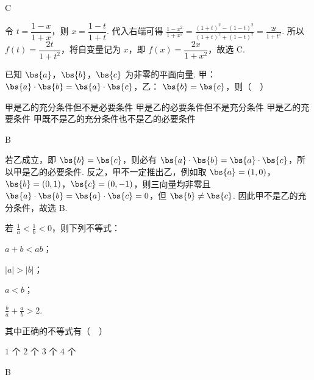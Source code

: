 \begin{answer}
C
\end{answer}

\begin{solution}
令 \(t=\dfrac{1-x}{1+x}\)，则 \(x=\dfrac{1-t}{1+t}\). 代入右端可得
\(\displaystyle\frac{1-x^2}{1+x^2}=\frac{(1+t)^2-(1-t)^2}{(1+t)^2+(1-t)^2}=\frac{2t}{1+t^2}\). 所以 \(f(t)=\dfrac{2t}{1+t^2}\)，将自变量记为 \(x\)，即 \(f(x)=\dfrac{2x}{1+x^2}\)，故选 C.
\end{solution}

\begin{problem}
已知 \(\bs{a}\)，\(\bs{b}\)，\(\bs{c}\) 为非零的平面向量. 甲： \(\bs{a} \cdot \bs{b} = \bs{a} \cdot \bs{c}\)，乙： \(\bs{b} = \bs{c}\)，则（\(\quad\)）

\choices
    {甲是乙的充分条件但不是必要条件}
    {甲是乙的必要条件但不是充分条件}
    {甲是乙的充要条件}
    {甲既不是乙的充分条件也不是乙的必要条件}
\end{problem}

\begin{answer}
B
\end{answer}

\begin{solution}
若乙成立，即 \(\bs{b}=\bs{c}\)，则必有 \(\bs{a}\cdot\bs{b}=\bs{a}\cdot\bs{c}\)，所以甲是乙的必要条件. 反之，甲不一定推出乙，例如取 \(\bs{a}=(1,0)\)，\(\bs{b}=(0,1)\)，\(\bs{c}=(0,-1)\)，则三向量均非零且 \(\bs{a}\cdot\bs{b}=\bs{a}\cdot\bs{c}=0\)，但 \(\bs{b}\ne\bs{c}\). 因此甲不是乙的充分条件，故选 B.
\end{solution}

\begin{problem}
若 \(\frac{1}{a} < \frac{1}{b} < 0\)，则下列不等式：

\begin{circlelist}
\item \(a + b < ab\)；
\item \(|a| > |b|\)；
\item \(a < b\)；
\item \(\frac{b}{a} + \frac{a}{b} > 2\).
\end{circlelist}

其中正确的不等式有（\(\quad\)）

\choices
    {\(1\) 个}
    {\(2\) 个}
    {\(3\) 个}
    {\(4\) 个}
\end{problem}

\begin{answer}
B
\end{answer}

